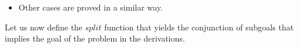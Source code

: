 \documentclass[../main.tex]{subfiles}
\begin{document}
\begin{sketchproof}
\begin{itemize}
\begin{itemize}
Finally, using the theorem \texttt{⇒∧⇒-to-⇒∧} from~\cite{AgdaProp},
\begin{equation*}
  \texttt{⇒∧⇒-to-⇒∧}\ :\ Γ ⊢ (φ₁ ⇒ φ₂) ∧ (φ₁ ⇒ φ₃) → Γ ⊢ φ₁ ⇒ (φ₂ ∧ φ₃),
\end{equation*}
\begin{equation*}
  \begin{bprooftree}
  \AxiomC{$\mathcal{D}_1$}
  \AxiomC{$\mathcal{D}_2$}
  \RightLabel{∧-intro}
  \BinaryInfC{$Γ ⊢ (φ₁ ⇒ φ₂) ∧ (φ₁ ⇒ φ₃)$}
  \RightLabel{\tt ⇒∧⇒-to-⇒∧.}
  \UnaryInfC{Γ ⊢ φ₁ ⇒ (φ₂ ∧ φ₃)}
  \end{bprooftree}
\end{equation*}
\item Other cases are proved in a similar way.
\end{itemize}
\end{itemize}
\end{sketchproof}

Let us now define the $split$ function that yields the conjunction of subgoals that implies the goal of the problem in the \Metis \TSTP derivations.
\end{document}
